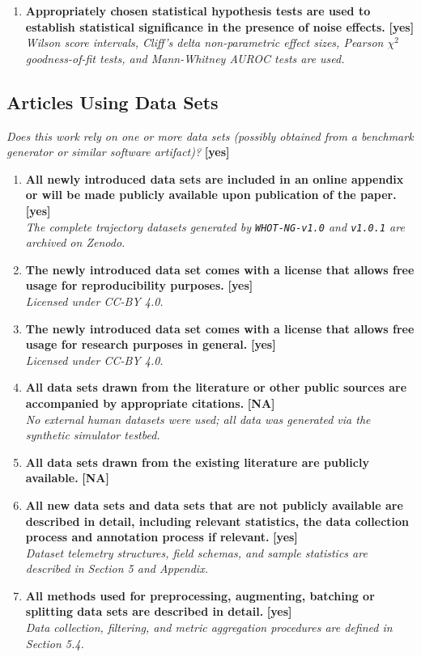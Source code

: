 \documentclass[11pt]{article}
\begin{document}
\begin{enumerate}
  \textit{Pilot evaluations ($n=20$ games each) and ablation ranges are reported in Sections 5 and 10.}
  \item \textbf{Appropriately chosen statistical hypothesis tests are used to establish statistical significance in the presence of noise effects.} \hfill \textbf{[yes]} \\
  \textit{Wilson score intervals, Cliff's delta non-parametric effect sizes, Pearson $\chi^2$ goodness-of-fit tests, and Mann-Whitney AUROC tests are used.}
\end{enumerate}

\subsection*{Articles Using Data Sets}
\textit{Does this work rely on one or more data sets (possibly obtained from a benchmark generator or similar software artifact)?} \hfill \textbf{[yes]}
\begin{enumerate}
  \item \textbf{All newly introduced data sets are included in an online appendix or will be made publicly available upon publication of the paper.} \hfill \textbf{[yes]} \\
  \textit{The complete trajectory datasets generated by \texttt{WHOT-NG-v1.0} and \texttt{v1.0.1} are archived on Zenodo.}
  \item \textbf{The newly introduced data set comes with a license that allows free usage for reproducibility purposes.} \hfill \textbf{[yes]} \\
  \textit{Licensed under CC-BY 4.0.}
  \item \textbf{The newly introduced data set comes with a license that allows free usage for research purposes in general.} \hfill \textbf{[yes]} \\
  \textit{Licensed under CC-BY 4.0.}
  \item \textbf{All data sets drawn from the literature or other public sources are accompanied by appropriate citations.} \hfill \textbf{[NA]} \\
  \textit{No external human datasets were used; all data was generated via the synthetic simulator testbed.}
  \item \textbf{All data sets drawn from the existing literature are publicly available.} \hfill \textbf{[NA]}
  \item \textbf{All new data sets and data sets that are not publicly available are described in detail, including relevant statistics, the data collection process and annotation process if relevant.} \hfill \textbf{[yes]} \\
  \textit{Dataset telemetry structures, field schemas, and sample statistics are described in Section 5 and Appendix.}
  \item \textbf{All methods used for preprocessing, augmenting, batching or splitting data sets are described in detail.} \hfill \textbf{[yes]} \\
  \textit{Data collection, filtering, and metric aggregation procedures are defined in Section 5.4.}
\end{enumerate}
\end{document}
